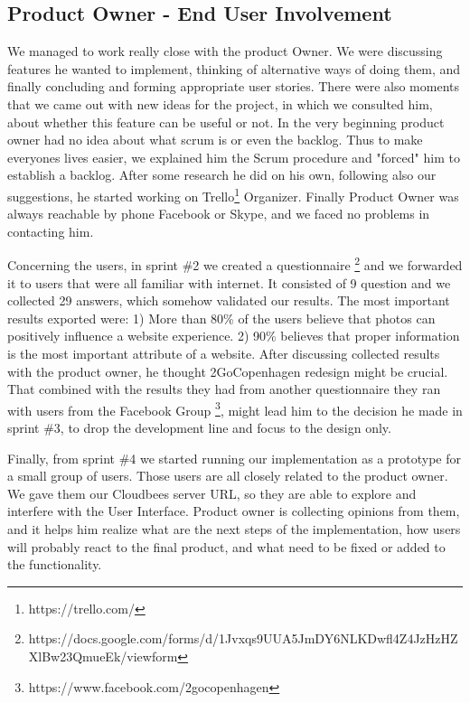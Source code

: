 
\subsection{Product Owner - End User Involvement}
We managed to work really close with the product Owner. We were discussing features he wanted to implement, thinking of alternative ways of doing them, and finally concluding and forming appropriate user stories. There were also moments that we came out with new ideas for the project, in which we consulted him, about whether this feature can be useful or not.
In the very beginning product owner had no idea about what scrum is or even the backlog. Thus to make everyones lives easier, we explained him the Scrum procedure and "forced" him to establish a backlog. After some research he did on his own, following also our suggestions, he started working on Trello\footnote{https://trello.com/} Organizer. 
Finally Product Owner was always reachable by phone Facebook or Skype, and we faced no problems in contacting him.

Concerning the users, in sprint \#2 we created a questionnaire \footnote{https://docs.google.com/forms/d/1Jvxqs9UUA5JmDY6NLKDwfl4Z4JzHzHZXlBw23QmueEk/viewform} and we forwarded it to users that were all familiar with internet. It consisted of 9 question and we collected 29 answers, which somehow validated our results. The most important results exported were: 1) More than 80\% of the users believe that photos can positively influence a website experience. 2) 90\% believes that proper information is the most important attribute of a website. After discussing collected results with the product owner, he thought 2GoCopenhagen redesign might be crucial. That combined with the results they had from another questionnaire they ran with users from the Facebook Group \footnote{https://www.facebook.com/2gocopenhagen}, might lead him to the decision he made in sprint \#3, to drop the development line and focus to the design only.

Finally, from sprint \#4 we started running our implementation as a prototype for a small group of users. Those users are all closely related to the product owner. We gave them our Cloudbees server URL, so they are able to explore and interfere with the User Interface. Product owner is collecting opinions from them, and it helps him realize what are the next steps of the implementation, how users will probably react to the final product, and what need to be fixed or added to the functionality.
